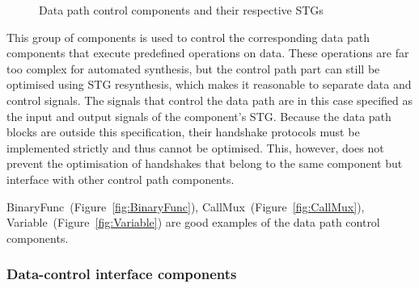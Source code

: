 \begin{figure}

\caption{Data path control components and their respective STGs}
\end{figure}


This group of components is used to control the corresponding
data path components that execute predefined operations on data. These
operations are far too complex for automated synthesis, but the control
path part can still be optimised using STG resynthesis, which makes
it reasonable to separate data and control signals. The signals that
control the data path are in this case specified as the input and
output signals of the component's STG. Because the data path blocks
are outside this specification, their handshake protocols must be
implemented strictly and thus cannot be optimised. This, however,
does not prevent the optimisation of handshakes that belong to the
same component but interface with other control path components.

BinaryFunc~(Figure~\ref{fig:BinaryFunc}), CallMux~(Figure~\ref{fig:CallMux}),
Variable~(Figure~\ref{fig:Variable}) are good examples of the data
path control components.


\subsubsection{Data-control interface components}

